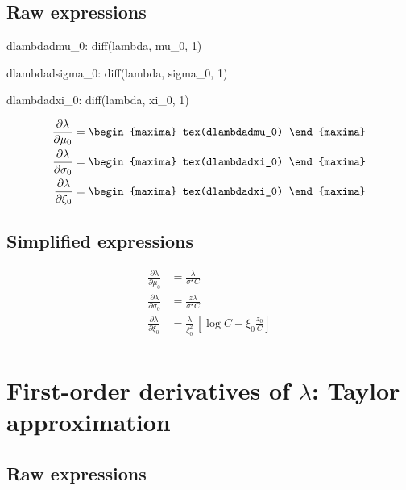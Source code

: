 \subsection*{Raw expressions}

\begin{maxima}
  dlambdadmu_0: diff(lambda, mu_0, 1)
\end{maxima}
\begin{maxima}
  dlambdadsigma_0: diff(lambda, sigma_0, 1)
\end{maxima}
\begin{maxima}
  dlambdadxi_0: diff(lambda, xi_0, 1)
\end{maxima}

{\color{MonVertF}
\begin{align*}
  \frac{\partial{\lambda}}{\partial \mu_0}
  &=
\begin{maxima}
  tex(dlambdadmu_0)
\end{maxima}\\
 \frac{\partial{\lambda}}{\partial \sigma_0}
  &=
\begin{maxima}
  tex(dlambdadxi_0)
\end{maxima}\\
\frac{\partial{\lambda}}{\partial \xi_0}
  &=
\begin{maxima}
  tex(dlambdadxi_0)
\end{maxima}
\end{align*}
}

\subsection*{Simplified expressions}

{\color{red}
\begin{align*}
  \frac{\partial{\lambda}}{\partial \mu_0}
  &= \frac{\lambda}{\sigma^\star C} \\
 \frac{\partial{\lambda}}{\partial \sigma_0}
  &=
 \frac{z \lambda}{\sigma^\star C}\\
\frac{\partial{\lambda}}{\partial \xi_0}
  &=  \frac{\lambda}{\xi_0^2} \, \left[ \log C - \xi_0 \frac{z_0}{C} \right]\\
\end{align*}
}

\section{First-order derivatives of $\lambda$: Taylor approximation}


\subsection*{Raw expressions}

